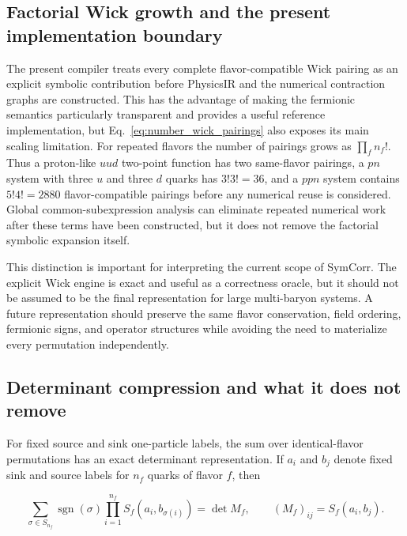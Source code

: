 \subsection{Factorial Wick growth and the present implementation boundary}
\label{subsec:future_wick_scaling}

The present compiler treats every complete flavor-compatible Wick pairing as an
explicit symbolic contribution before PhysicsIR and the numerical contraction
graphs are constructed. This has the advantage of making the fermionic
semantics particularly transparent and provides a useful reference
implementation, but Eq.~\eqref{eq:number_wick_pairings} also exposes its main
scaling limitation. For repeated flavors the number of pairings grows as
\(\prod_f n_f!\). Thus a proton-like \(uud\) two-point function has two
same-flavor pairings, a \(pn\) system with three \(u\) and three \(d\) quarks has
\(3!3!=36\), and a \(ppn\) system contains \(5!4!=2880\) flavor-compatible
pairings before any numerical reuse is considered. Global common-subexpression
analysis can eliminate repeated numerical work after these terms have been
constructed, but it does not remove the factorial symbolic expansion itself.

This distinction is important for interpreting the current scope of SymCorr.
The explicit Wick engine is exact and useful as a correctness oracle, but it
should not be assumed to be the final representation for large multi-baryon
systems. A future representation should preserve the same flavor conservation,
field ordering, fermionic signs, and operator structures while avoiding the
need to materialize every permutation independently.

\subsection{Determinant compression and what it does not remove}
\label{subsec:future_determinants}

For fixed source and sink one-particle labels, the sum over identical-flavor
permutations has an exact determinant representation. If \(a_i\) and \(b_j\)
denote fixed sink and source labels for \(n_f\) quarks of flavor \(f\), then

\begin{equation}
\sum_{\sigma\in S_{n_f}}
\operatorname{sgn}(\sigma)
\prod_{i=1}^{n_f}
S_f(a_i,b_{\sigma(i)})
=
\det M_f,
\qquad
(M_f)_{ij}=S_f(a_i,b_j).
\label{eq:future_determinant_identity}
\end{equation}

